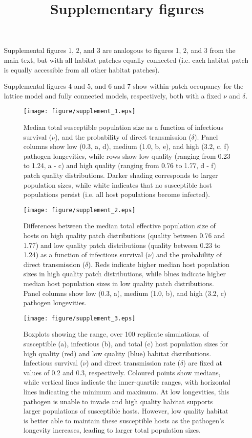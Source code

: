 \documentclass{article}
\title{Supplementary figures}
\begin{document}
\maketitle

Supplemental figures 1, 2, and 3 are analogous to figures 1, 2, and 3 from the main text, but with all habitat patches equally connected (i.e. each habitat patch is equally accessible from all other habitat patches).

Supplemental figures 4 and 5, and 6 and 7 show within-patch occupancy for the lattice model and fully connected models, respectively, both with a fixed $\nu$ and $\delta$.

\begin{figure}
\texttt{[image: figure/supplement\_1.eps]}
\caption{Median total susceptible population size as a function of infectious survival ($\nu$), and the probability of direct transmission ($\delta$).  Panel columns show low (0.3, a, d), medium (1.0, b, e), and high (3.2, c, f) pathogen longevities, while rows show low quality (ranging from 0.23 to 1.24, a - c) and high quality (ranging from 0.76 to 1.77, d - f) patch quality distributions.  Darker shading corresponds to larger population sizes, while white indicates that no susceptible host populations persist (i.e. all host populations become infected).}
\label{endemic}
\end{figure}

\begin{figure}
\texttt{[image: figure/supplement\_2.eps]}
\centering
\caption{Differences between the median total effective population size of hosts on high quality patch distributions (quality between 0.76 and 1.77) and low quality patch distributions (quality between 0.23 to 1.24) as a function of infectious survival ($\nu$) and the probability of direct transmission ($\delta$).  Reds indicate higher median host population sizes in high quality patch distributions, while blues indicate higher median host population sizes in low quality patch distributions.  Panel columns show low (0.3, a), medium (1.0, b), and high (3.2, c) pathogen longevities.}
\label{highvlow}
\end{figure}

\begin{figure}
\texttt{[image: figure/supplement\_3.eps]}
\centering
\caption{Boxplots showing the range, over 100 replicate simulations, of susceptible (a), infectious (b), and total (c) host population sizes for high quality (red) and low quality (blue) habitat distributions.  Infectious survival ($\nu$) and direct transmission rate ($\delta$) are fixed at values of 0.2 and 0.3, respectively.  Coloured points show medians, while vertical lines indicate the inner-quartile ranges, with horizontal lines indicating the minimum and maximum.  At low longevities, this pathogen is unable to invade and high quality habitat supports larger populations of susceptible hosts.  However, low quality habitat is better able to maintain these susceptible hosts as the pathogen's longevity increases, leading to larger total population sizes.}
\label{popsizes}
\end{figure}
\end{document}
